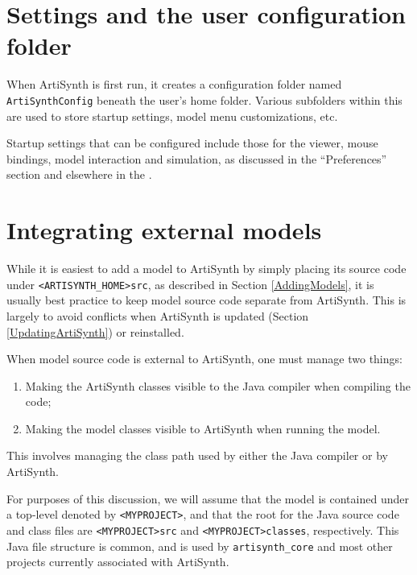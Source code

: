 \section{Settings and the user configuration folder}
\label{UserConfigFolder:sec}

When ArtiSynth is first run, it creates a configuration folder named
{\tt ArtiSynthConfig} beneath the user's home folder. Various
subfolders within this are used to store startup settings, model menu
customizations, etc.

Startup settings that can be configured include those for the viewer,
mouse bindings, model interaction and simulation, as discussed in the
``Preferences'' section and elsewhere in the
.

\section{Integrating external models}
\label{IntegratingExternalModels}

While it is easiest to add a model to ArtiSynth by simply placing its
source code under {\tt <ARTISYNTH\_HOME>\SEP src}, as described in
Section \ref{AddingModels}, it is usually best practice to keep model
source code separate from ArtiSynth. This is largely to avoid
conflicts when ArtiSynth is updated (Section \ref{UpdatingArtiSynth})
or reinstalled.

When model source code is external to ArtiSynth, one must manage two
things:

\begin{enumerate}

\item Making the ArtiSynth classes visible to the Java compiler
when compiling the code;

\item Making the model classes visible to ArtiSynth when running
the model.

\end{enumerate}

This involves managing the class path used by either the Java compiler
or by ArtiSynth.

For purposes of this discussion, we will assume that the model is
contained under a top-level \directory{} denoted by {\tt <MYPROJECT>},
and that the root \directories{} for the Java source code and class
files are {\tt <MYPROJECT>\SEP src} and
\pdfbreak
{\tt <MYPROJECT>\SEP classes}, respectively. This Java file structure
is common, and is used by {\tt artisynth\_core} and most other
projects currently associated with ArtiSynth.

